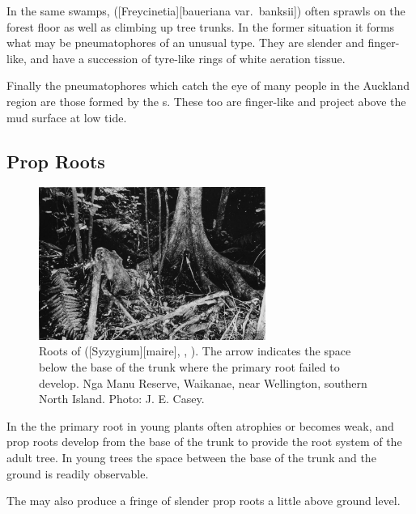 In the same swamps,  ([Freycinetia][baueriana var.\ banksii]) often sprawls on the forest floor as well as climbing up tree trunks.
In the former situation it forms what may be pneumatophores of an unusual type.
They are slender and finger-like, and have a succession of tyre-like rings of white aeration tissue.

Finally the pneumatophores which catch the eye of many people in the Auckland region are those formed by the s.
These too are finger-like and project above the mud surface at low tide.

\subsection{Prop Roots}

\begin{figure}
	\includegraphics[width=0.66\textwidth]{graphics/figure14swampmaire.jpg}
	\centering
	\caption[Roots of swamp maire]{Roots of  ([Syzygium][maire], , ).
	The arrow indicates the space below the base of the trunk where the primary root failed to develop.
	Nga Manu Reserve, Waikanae, near Wellington, southern North Island.
	Photo:  J. E. Casey.}%
	\label{fig:14swampmaire}
\end{figure}

In the  the primary root in young plants often atrophies or becomes weak, and prop roots develop from the base of the trunk to provide the root system of the adult tree.
In young trees the space between the base of the trunk and the ground is readily observable.

The  may also produce a fringe of slender prop roots a little above ground level.

